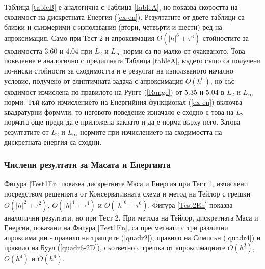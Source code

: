 \documentclass[a4paper]{article}
\newcommand{\rf}[1]{(\ref{#1})}
\theoremstyle{remark}
\begin{document}
\begin{large}
Таблица \ref{tableB} е аналогична с Таблица \ref{tableA}, но показва скоростта на сходимост на дискретната Енергия \rf{ex-en}. Резултатите от двете таблици са близки и съизмерими с използвания (втори, четвърти и шести) ред на апроксимация. Само при  Тест 2 и апроксимация $O(|h|^6 + \tau^6)$ стойностите за сходимостта $3.6$0 и $4.04$ при $L_2$ и $L_{\infty}$ норми са по-малко от очакваното. Това поведение е аналогично с предишната Таблица \ref{tableA}, където също са получени по-ниски стойности за сходимостта и е резултат на използваното начално условие, получено от елиптичната задача с апроксимация $O(h^6)$, но със сходимост изчислена по правилото на Рунге \rf{Runge} от $5.35$ и $5.04$ в $L_2$ и $L_\infty$ норми. Тъй като изчислението на Енергийния функционал \rf{ex-en} включва квадратурни формули, то неговото поведение изначало е сходно с това на $L_2$ нормата още преди да е приложена каквато и да е норма върху него. Затова резултатите от $L_2$ и $L_\infty$ нормите при изчислението на сходимостта на дискретната енергия са сходни.

\subsubsection{Числени резултати за Масата и Енергията}
Фигура \ref{Test1En} показва дискретните Маса и Енергия при Тест 1, изчислени посредством решенията от Консервативната схема и метод на Тейлор с грешки $O(|h|^{2} + \tau^2 )$, $O(|h|^{4} + \tau^4 )$ и $O(|h|^{6} + \tau^6 )$. Фигура \ref{Test2En} показва аналогични резултати, но при Тест 2. При метода на Тейлор, дискретната Маса и Енергия, показани на Фигура \ref{Test1En}, са пресметнати с три различни апроксимации - правило на трапците \rf{quadr2}, правило на Симпсън \rf{quadr4} и правило на Буул \rf{quadr6-2D}, съответно с грешка от апроксимациите $O(h^2)$, $O(h^4)$ и $O(h^6)$. 


\end{large}
\end{document}
